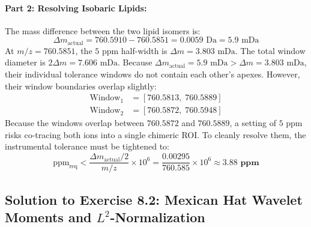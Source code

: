 \documentclass[11pt,twoside,openright]{book}
\begin{document}
\paragraph{Part 2: Resolving Isobaric Lipids:}
The mass difference between the two lipid isomers is:
\begin{equation*}
\Delta m_{\text{actual}} = 760.5910 - 760.5851 = 0.0059\text{ Da} = 5.9\text{ mDa}
\end{equation*}
At $m/z = 760.5851$, the $5\text{ ppm}$ half-width is $\Delta m = 3.803\text{ mDa}$. The total window diameter is $2 \Delta m = 7.606\text{ mDa}$.
Because $\Delta m_{\text{actual}} = 5.9\text{ mDa} > \Delta m = 3.803\text{ mDa}$, their individual tolerance windows do not contain each other's apexes. However, their window boundaries overlap slightly:
\begin{align*}
\text{Window}_1 &= [760.5813, \; 760.5889] \\
\text{Window}_2 &= [760.5872, \; 760.5948]
\end{align*}
Because the windows overlap between $760.5872$ and $760.5889$, a setting of $5\text{ ppm}$ risks co-tracing both ions into a single chimeric ROI. To cleanly resolve them, the instrumental tolerance must be tightened to:
\begin{equation*}
\text{ppm}_{\text{req}} < \frac{\Delta m_{\text{actual}} / 2}{m/z} \times 10^6 = \frac{0.00295}{760.585} \times 10^6 \approx \mathbf{3.88\text{ ppm}}
\end{equation*}

\subsection*{Solution to Exercise 8.2: Mexican Hat Wavelet Moments and $L^2$-Normalization}
\end{document}
